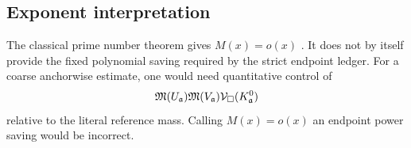 \subsection{Exponent interpretation}

The classical prime number theorem gives \(M(x)=o(x)\)
\citep{IwaniecKowalski2004}.  It does not by itself provide the fixed
polynomial saving required by the strict endpoint ledger.  For a coarse
anchorwise estimate, one would need quantitative control of
\[
 \mathfrak M(U_{\mathfrak a})
 \mathfrak M(V_{\mathfrak a})
 \mathcal V_\square(K_{\mathfrak a}^{0})
\]
relative to the literal reference mass.  Calling \(M(x)=o(x)\) an endpoint
power saving would be incorrect.
